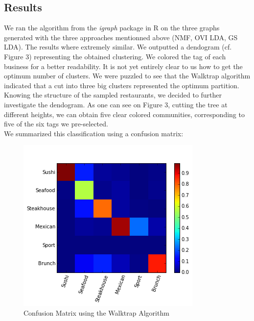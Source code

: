 \documentclass[twoside]{article}
\begin{document}
\begin{multicols}{2}
\subsection{Results}

We ran the algorithm from the \emph{igraph} package in R on the three graphs generated with the three approaches mentionned above (NMF, OVI LDA, GS LDA). The results where extremely similar. We outputted a dendogram (cf. Figure 3) representing the obtained clustering. We colored the tag of each business for a better readability.  It is not yet entirely clear to us how to get the optimum number of clusters. We were puzzled to see that the Walktrap algorithm indicated that a cut into three big clusters represented the optimum partition. Knowing the structure of the sampled restaurants, we decided to further investigate the dendogram. As one can see on Figure 3, cutting the tree at different heights, we can obtain five clear colored communities, corresponding to five of the six tags we pre-selected.\\

\noindent We summarized this classification using a confusion matrix: 
\begin{figure}[H]
\centering
\includegraphics[width=1\linewidth]{img/confusion}
\caption{Confusion Matrix using the Walktrap Algorithm}
\end{figure}


\end{multicols}
\end{document}
